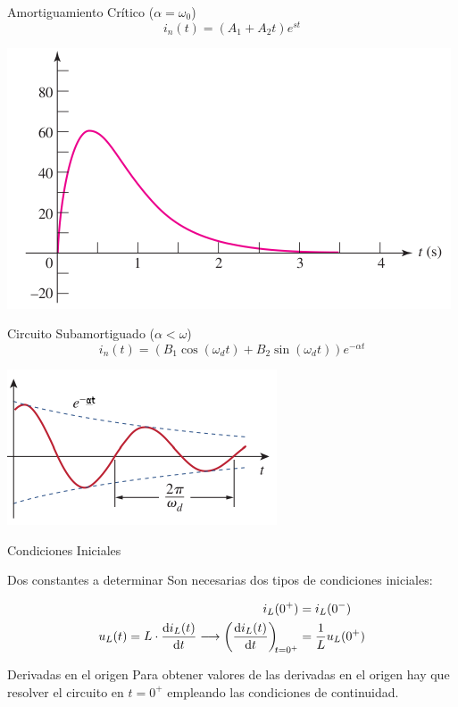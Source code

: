 \documentclass[aspectratio=169, usenames,svgnames,dvipsnames]{beamer}
\begin{document}
\begin{frame}[label={sec:org54c813f}]{Amortiguamiento Crítico (\(\alpha = \omega_0\))}
\[
  \boxed{i_n(t) = (A_1 + A_2 t) e^{s t} }
\]
\begin{center}
\includegraphics[height=0.65\textheight]{../figs/AmortiguamientoCritico_HKD.pdf}
\end{center}
\end{frame}
\begin{frame}[label={sec:org1b40efe}]{Circuito Subamortiguado (\(\alpha < \omega\))}
\[
  \boxed{i_n(t) = (B_1\cos(\omega_d t) + B_2\sin(\omega_d t)) e^{-\alpha t}}
\]
\begin{center}
\includegraphics[height=0.65\textheight]{../figs/Subamortiguado_AS.pdf}
\end{center}
\end{frame}
\begin{frame}[label={sec:orgc1c7e0a}]{Condiciones Iniciales}
\begin{block}{Dos constantes a determinar}
Son necesarias dos tipos de condiciones iniciales:

\begin{align*}
  i_L(0^+) &= i_L(0^-)\\
  u_L(t) = L \cdot \diff{i_L(t)}{t} \longrightarrow   \diff{i_L(t)}{t}[t = 0^+] &= \frac{1}{L} u_L(0^+)
\end{align*}
\end{block}
\begin{block}{Derivadas en el origen}
Para obtener valores de las derivadas en el origen hay que resolver el circuito en \(t = 0^+\) empleando las condiciones de continuidad.
\end{block}
\end{frame}
\end{document}
